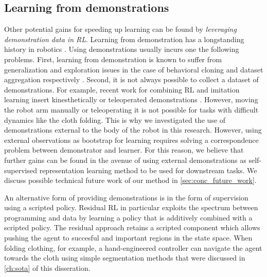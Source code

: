\documentclass[\home/main.tex]{subfiles}
\begin{document}
\subsection{Learning from demonstrations}
Other potential gains for speeding up learning can be found by \emph{leveraging demonstration data in RL}. 
Learning from demonstration has a longstanding history in robotics \autocite{Argall2009}. Using demonstrations usually incurs one the following problems. 
First, learning from demonstration is known to suffer from generalization and exploration issues in the case of behavioral cloning and dataset aggregation respectively \autocite{Ibarz2021}.
Second, it is not always possible to collect a dataset of demonstrations. For example, recent work for combining RL and imitation learning insert kinesthetically \autocite{vecerik2018leveraging} or teleoperated demonstrations \autocite{Zhu-RSS-18}. However, moving the robot arm manually or teleoperating it is not possible for tasks with difficult dynamics like the cloth folding. This is why we investigated the use of demonstrations external to the body of the robot in this research. However, using external observations as bootstrap for learning requires solving a correspondence problem between demonstrator and learner. For this reason, we believe that further gains can be found in the avenue of using external demonstrations as self-supervised representation learning method to be used for downstream tasks. We discuss possible technical future work of our method in \cref{sec:conc_future_work}. 

An alternative form of providing demonstrations is in the form of supervision using a scripted policy. Residual RL in particular exploits the spectrum between programming and data by learning a policy that is additively combined with a scripted policy. The residual approach retains a scripted component which allows pushing the agent to succesful and important regions in the state space. When folding clothing, for example, a hand-engineered controller can navigate the agent towards the cloth using simple segmentation methods that were discussed in \cref{ch:sota} of this disseration. 
\end{document}
